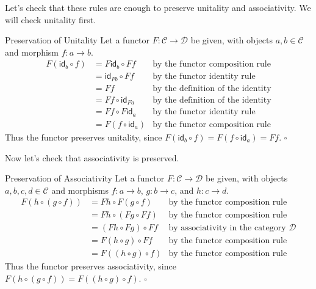 \documentclass[12pt]{article}
\begin{document}
Let's check that these rules are enough to preserve unitality and associativity.
We will check unitality first.
\begin{proofbox}{Preservation of Unitality}{}
    Let a functor $F:\mathcal{C} \rightarrow \mathcal{D}$ be given, with objects $a,b\in\mathcal{C}$ and morphism $f:a \rightarrow b$.
    \begin{align*}
        F(\mathsf{id}_b \circ f) & = F\mathsf{id}_b \circ Ff   & \text{by the functor composition rule}   \\
                                 & = \mathsf{id}_{Fb} \circ Ff & \text{by the functor identity rule}      \\
                                 & = Ff                        & \text{by the definition of the identity} \\
                                 & = Ff \circ \mathsf{id}_{Fa} & \text{by the definition of the identity} \\
                                 & = Ff \circ F\mathsf{id}_a   & \text{by the functor identity rule}      \\
                                 & = F(f \circ \mathsf{id}_a)  & \text{by the functor composition rule}
    \end{align*}
    Thus the functor preserves unitality, since $F(\mathsf{id}_b \circ f) = F(f \circ \mathsf{id}_a) = Ff$. $\square$
\end{proofbox}
Now let's check that associativity is preserved.
\begin{proofbox}{Preservation of Associativity}{}
    Let a functor $F:\mathcal{C} \rightarrow \mathcal{D}$ be given, with objects $a,b,c,d\in\mathcal{C}$ and morphisms $f:a \rightarrow b$, $g:b \rightarrow c$, and $h:c \rightarrow d$.
    \begin{align*}
        F(h \circ (g \circ f)) & = Fh \circ F(g \circ f)  & \text{by the functor composition rule}                \\
                               & = Fh \circ (Fg \circ Ff) & \text{by the functor composition rule}                \\
                               & = (Fh \circ Fg) \circ Ff & \text{by associativity in the category $\mathcal{D}$} \\
                               & = F(h \circ g) \circ Ff  & \text{by the functor composition rule}                \\
                               & = F((h \circ g) \circ f) & \text{by the functor composition rule}
    \end{align*}
    Thus the functor preserves associativity, since $F(h \circ (g \circ f)) = F((h \circ g) \circ f)$. $\square$
\end{proofbox}
\end{document}
